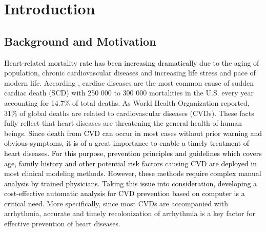  \chapter{Introduction}

 \section{Background and Motivation}
 
\textcolor{black}{Heart-related mortality rate has been increasing dramatically due to the} aging of population, chronic cardiovascular diseases and increasing life stress and pace of modern life\cite{mortality}. According \cite{SCDnumber}, %
cardiac diseases are the most common cause of sudden cardiac death (SCD) with 250 000 to 300 000 mortalities in the U.S. every year accounting for 14.7\% of total deaths\cite{SCDnumber}. As World Health Organization reported, 31\% of global deaths are related to cardiovascular diseases (CVDs)\cite{who}. %
These facts fully reflect that heart diseases are threatening the general health of human beings. %
\textcolor{black}{Since death from CVD can occur in most cases without prior warning and obvious symptoms, it is of a great importance to enable a timely treatment of heart diseases. For this purpose, prevention principles and guidelines which covers age, family history and other potential risk factors causing CVD are deployed in most clinical modeling methods\cite{smith2004principles}. However, these methods require complex manual analysis by trained physicians. Taking this issue into consideration, developing a cost-effective automatic analysis for CVD prevention based on computer is a critical need.}
More specifically, since most CVDs are accompanied with arrhythmia, accurate and timely recolonization of arrhythmia is a key factor for effective prevention of heart diseases. %

